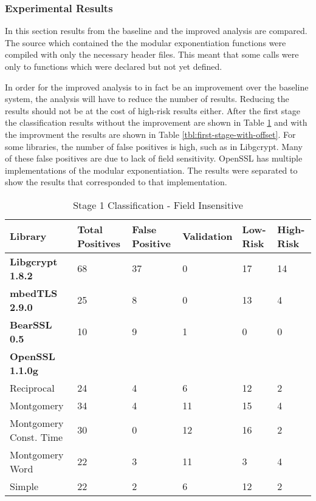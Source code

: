 \documentclass[11pt,a4paper]{article}
\begin{document}
\subsubsection{Experimental Results}

In this section results from the baseline and the improved analysis are
compared. The source which contained the the modular exponentiation functions
were compiled with only the necessary header files. This meant that some
calls were only to functions which were declared but not yet defined.

In order for the improved analysis to in fact be an improvement over the
baseline system, the analysis will have to reduce the number of results.
Reducing the results should not be at the cost of high-risk results either.
After the first stage the classification results without the improvement are
shown in Table \ref{tbl:first-stage-no-offset} and with the improvment the
results are shown in Table \ref{tbl:first-stage-with-offset}. For some
libraries, the number of false positives is high, such as in Libgcrypt. Many of
these false positives are due to lack of field sensitivity. OpenSSL has multiple
implementations of the modular exponentiation. The results were separated to
show the results that corresponded to that implementation.

\begin{table}
  \centering
  \begin{tabular}{|p{2cm}|p{2cm}|p{2cm}|p{2cm}|p{2cm}|p{2cm}|}
    \hline
    \textbf{Library }& \textbf{Total Positives} & \textbf{False Positive} & \textbf{Validation} & \textbf{Low-Risk} & \textbf{High-Risk} \\
    \hline
    \textbf{Libgcrypt 1.8.2} & 68 & 37 & 0 & 17 & 14\\
    \textbf{mbedTLS 2.9.0} & 25 & 8 & 0 & 13 & 4 \\
    \textbf{BearSSL 0.5} & 10 & 9 & 1 & 0 & 0 \\
    \textbf{OpenSSL 1.1.0g} & & & & &  \\
    Reciprocal & 24 & 4  & 6 & 12 & 2 \\
    Montgomery & 34 & 4   & 11   & 15  &  4  \\
    Montgomery Const. Time & 30 & 0   & 12    &  16   &  2  \\
    Montgomery Word & 22 & 3   & 11    & 3    & 4   \\
    Simple & 22 & 2    & 6    & 12    & 2   \\
    \hline
  \end{tabular}
  \caption{Stage 1 Classification - Field Insensitive}
  \label{tbl:first-stage-no-offset}
\end{table}
\end{document}
